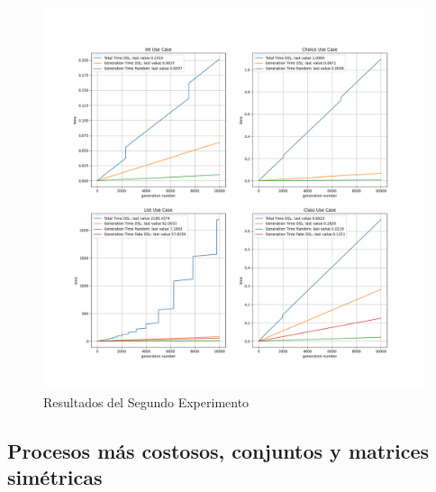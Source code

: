 \begin{figure}[!ht]
      \includegraphics[width=\linewidth]{Graphics/exp2.png}
      \caption{Resultados del Segundo Experimento}
      \label{fig:exp2}
\end{figure}

\subsection{Procesos más costosos, conjuntos y matrices simétricas}

